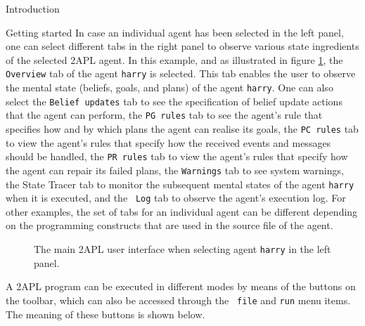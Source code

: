 \begin{chapter}{Introduction}
\begin{section}{Getting started}
In case an individual agent has been selected in the left panel, one
can select different tabs in the right panel to observe various
state ingredients of the selected 2APL agent. In this example, and
as illustrated in figure \ref{fig:harry}, the {\tt Overview} tab of
the agent {\tt harry} is selected. This tab enables the user to
observe the mental state (beliefs, goals, and plans) of the agent
{\tt harry}. One can also select the {\tt Belief updates} tab to see
the specification of belief update actions that the agent can
perform, the {\tt PG rules} tab to see the agent's rule that
specifies how and by which plans the agent can realise its goals,
the {\tt PC rules} tab to view the agent's rules that specify how
the received events and messages should be handled, the {\tt PR
rules} tab to view the agent's rules that specify how the agent can
repair its failed plans, the {\tt Warnings} tab to see system
warnings, the {State Tracer} tab to monitor the subsequent mental
states of the agent {\tt harry} when it is executed, and the {\tt
Log} tab to observe the agent's execution log. For other examples,
the set of tabs for an individual agent can be different depending
on the programming constructs that are used in the source file of
the agent.

    \begin{figure}
        \begin{center}
            \caption{The main 2APL user interface when selecting agent {\tt harry} in the left panel.}\label{fig:harry}
        \end{center}
    \end{figure}

A 2APL program can be executed in different modes by means of the
buttons on the toolbar, which can also be accessed through the {\tt
file} and {\tt run} menu items. The meaning of these buttons is
shown below.


\end{section}
\end{chapter}
